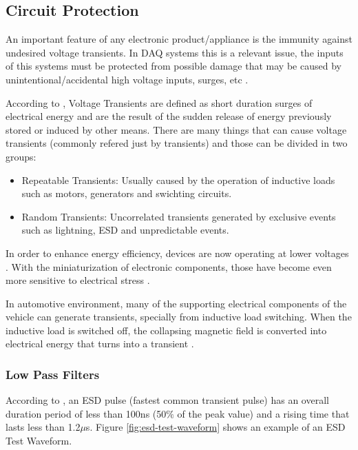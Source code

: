\subsection{Circuit Protection}\label{ssec:circuitProtection}
	An important feature of any electronic product/appliance is the immunity against undesired voltage transients. In DAQ systems this is a relevant issue, the inputs of this systems must be protected from possible damage that may be caused by unintentional/accidental high voltage inputs, surges, etc \cite{mathivanan2007pc}.
	\par
	According to \cite{littlelFuseWhatIsTransientVoltage}, Voltage Transients are defined as short duration surges of electrical energy and are the result of the sudden release of energy previously stored or induced by other means. There are many things that can cause voltage transients (commonly refered just by transients) and those can be divided in two groups:

	\begin{itemize}
		\item Repeatable Transients: Usually caused by the operation of inductive loads such as motors, generators and swichting circuits.\label{itm:repeatable-transients}
		\item Random Transients: Uncorrelated transients generated by exclusive events such as lightning, ESD and unpredictable events.\label{itm:random-transients}
	\end{itemize}

	In order to enhance energy efficiency, devices are now operating at lower voltages \cite{xavier2017benefits}. With the miniaturization of electronic components, those have become even more sensitive to electrical stress \cite{littlelFuseWhatIsTransientVoltage}.
	\par
	In automotive environment, many of the supporting electrical components of the vehicle can generate transients, specially from inductive load switching. When the inductive load is switched off, the collapsing magnetic field is converted into electrical energy that turns into a transient \cite{littlelFuseWhatIsTransientVoltage}.

	\subsubsection{Low Pass Filters}\label{sssec:lowPassFilterTransientProtection}
		According to \cite{littlelFuseWhatIsTransientVoltage}, an ESD pulse (fastest common transient pulse) has an overall duration period of less than 100ns (50$\%$ of the peak value) and a rising time that lasts less than 1.2$\mu$s. Figure \ref{fig:esd-test-waveform} shows an example of an ESD Test Waveform.

